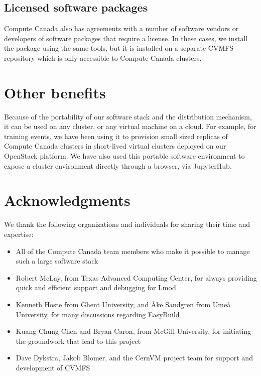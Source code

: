 \documentclass[sigconf]{acmart}
\begin{document}
\subsection{Licensed software packages}
\label{sub:Licensed_software_packages}
Compute Canada also has agreements with a number of software vendors or developers of software packages that require a
license. In these cases, we install the package using the same tools, but it is installed on a separate CVMFS
repository which is only accessible to Compute Canada clusters.

\section{Other benefits}
\label{sec:Other_benefits}
Because of the portability of our software stack and the distribution mechanism, it can be used on any cluster, or any
virtual machine on a cloud. For example, for training events, we have been using it to provision small sized replicas
of Compute Canada clusters in short-lived virtual clusters deployed on our OpenStack platform. We have also used this
portable software environment to expose a cluster environment directly through a browser, via JupyterHub.

\section{Acknowledgments}
\label{sec:Acknowledgments}
We thank the following organizations and individuals for sharing their time and expertise:
\begin{itemize}
	\item All of the Compute Canada team members who make it possible to manage such a large software stack
	\item Robert McLay, from Texas Advanced Computing Center, for always providing quick and efficient support and
debugging for Lmod
	\item Kenneth Hoste from Ghent University, and Åke Sandgren from Umeå University, for many discussions
regarding EasyBuild
	\item Kuang Chung Chen and Bryan Caron, from McGill University, for initiating the groundwork that lead to this
project
	\item Dave Dykstra, Jakob Blomer, and the CernVM project team for support and development of CVMFS
\end{itemize}

%


\end{document}
